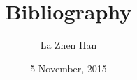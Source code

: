 \documentclass[12pt]{article}
\begin{document}
\title{Bibliography}
\author{La Zhen Han}
\date{5 November, 2015}
\maketitle



\end{document}
